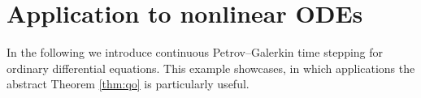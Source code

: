 \documentclass[10pt,reqno]{amsart}
\theoremstyle{definition}
\theoremstyle{remark}
\newtheorem{remark}[theorem]{Remark}
\newcommand{\N}{\mathbb N}
\newcommand{\Nzero}{\mathbb N_0}
\newcommand{\norm}[1]{\lVert #1\rVert}
\newcommand{\dual}[2]{\langle #1,#2\rangle}
\begin{document}

\section{Application to nonlinear ODEs}\label{sec:examples}
\noindent
In the following we introduce continuous Petrov--Galerkin time stepping for ordinary differential equations. This example showcases, in which applications the abstract Theorem \ref{thm:qo} is particularly useful. 
\end{document}
